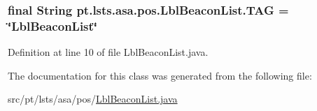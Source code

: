\subsubsection[{T\+A\+G}]{\setlength{\rightskip}{0pt plus 5cm}final String pt.\+lsts.\+asa.\+pos.\+Lbl\+Beacon\+List.\+T\+A\+G = \char`\"{}Lbl\+Beacon\+List\char`\"{}\hspace{0.3cm}{\ttfamily [static]}}\label{classpt_1_1lsts_1_1asa_1_1pos_1_1LblBeaconList_a5275cc5b312241a0fe5454d8066decd8}


Definition at line 10 of file Lbl\+Beacon\+List.\+java.



The documentation for this class was generated from the following file\+:\begin{DoxyCompactItemize}
\item 
src/pt/lsts/asa/pos/\hyperlink{LblBeaconList_8java}{Lbl\+Beacon\+List.\+java}\end{DoxyCompactItemize}
